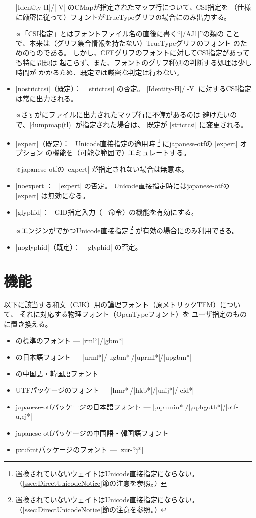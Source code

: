 \documentclass[uplatex,dvipdfmx,a4paper]{jsarticle}
\newcommand{\Pkg}[1]{\textsf{#1}}
\newcommand{\Note}{\par\noindent ※}
\newcommand{\Means}{：\ }
\begin{document}
\begin{itemize}
  |Identity-H|/|-V| のCMapが指定されたマップ行について、CSI指定を
  （仕様に厳密に従って）フォントがTrueTypeグリフの場合にのみ出力する。
  \Note 「CSI指定」とはフォントファイル名の直後に書く“|/AJ1|”の類の
    ことで、本来は（グリフ集合情報を持たない）TrueTypeグリフのフォント
    のためのものである。
    しかし、CFFグリフのフォントに対してCSI指定があっても特に問題は
    起こらず、また、フォントのグリフ種別の判断する処理は少し時間が
    かかるため、既定では厳密な判定は行わない。
\item |nostrictcsi|（既定）\Means
  |strictcsi| の否定。
  |Identity-H|/|-V| に対するCSI指定は常に出力される。
  \Note さすがにファイルに出力されたマップ行に不備があるのは
    避けたいので、|dumpmap(tl)| が指定された場合は、
    既定が |strictcsi| に変更される。
\item |expert|（既定）\Means
  Unicode直接指定の適用時
  \footnote{置換されていないウェイトはUnicode直接指定にならない。
    （\ref{ssec:DirectUnicodeNotice}節の注意を参照。）}%
  に\Pkg{japanese-otf}の |expert| オプション
  の機能を（可能な範囲で）エミュレートする。
  \Note \Pkg{japanese-otf}の |expert| が指定されない場合は無意味。
\item |noexpert|\Means
  |expert| の否定。
  Unicode直接指定時には\Pkg{japanese-otf}の |expert| は無効になる。
\item |glyphid|\Means
  GID指定入力（|\gid| 命令）の機能を有効にする。
  \Note エンジンが{\upTeX}でかつUnicode直接指定
  \footnote{置換されていないウェイトはUnicode直接指定にならない。
    （\ref{ssec:DirectUnicodeNotice}節の注意を参照。）}%
  が有効の場合にのみ利用できる。
\item |noglyphid|（既定）\Means
  |glyphid| の否定。
\end{itemize}

\section{機能}

以下に該当する和文（CJK）用の論理フォント（原メトリックTFM）について、
それに対応する物理フォント（OpenTypeフォント）を
ユーザ指定のものに置き換える。
\begin{itemize}
\item {\pTeX}の標準のフォント --- |rml*|/|gbm*|
\item {\upTeX}の日本語フォント --- |urml*|/|ugbm*|/|uprml*|/|upgbm*|
\item {\upTeX}の中国語・韓国語フォント
\item \Pkg{UTF}パッケージのフォント --- |hmr*|/|hkb*|/|unij*|/|cid*|
\item \Pkg{japanese-otf}パッケージの日本語フォント
  --- |{,up}hmin*|/|{,up}hgoth*|/|otf-{u,c}j*|
\item \Pkg{japanese-otf}パッケージの中国語・韓国語フォント
\item \Pkg{pxufont}パッケージのフォント
  --- |zur-?j*|
\end{itemize}
\end{document}
